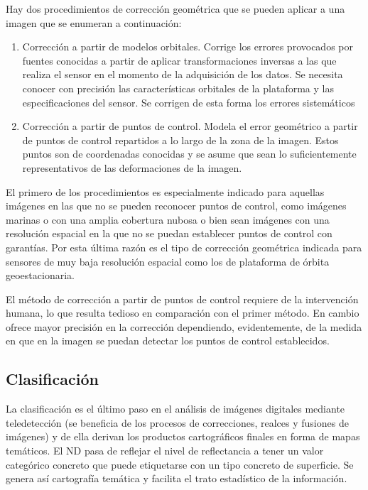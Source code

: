 Hay dos procedimientos de corrección geométrica que se pueden aplicar a una imagen que se enumeran a continuación:

\begin{enumerate}
	\item Corrección a partir de modelos orbitales. Corrige los errores provocados por fuentes conocidas a partir de aplicar transformaciones inversas a las que realiza el sensor en el momento de la adquisición de los datos. Se necesita conocer con precisión las características orbitales de la plataforma y las especificaciones del sensor. Se corrigen de esta forma los errores sistemáticos
	\item Corrección a partir de puntos de control. Modela el error geométrico a partir de puntos de control repartidos a lo largo de la zona de la imagen. Estos puntos son de coordenadas conocidas y se asume que sean lo suficientemente representativos de las deformaciones de la imagen.
\end{enumerate}

El primero de los procedimientos es especialmente indicado para aquellas imágenes en las que no se pueden reconocer puntos de control, como imágenes marinas o con una amplia cobertura nubosa o bien sean imágenes con una resolución espacial en la que no se puedan establecer puntos de control con garantías. Por esta última razón es el tipo de corrección geométrica indicada para sensores de muy baja resolución espacial como los de plataforma de órbita geoestacionaria.%

El método de corrección a partir de puntos de control requiere de la intervención humana, lo que resulta tedioso en comparación con el primer método. En cambio ofrece mayor precisión en la corrección dependiendo, evidentemente, de la medida en que en la imagen se puedan detectar los puntos de control establecidos.%

\subsection{Clasificación}
La clasificación es el último paso en el análisis de imágenes digitales mediante teledetección (se beneficia de los procesos de correcciones, realces y fusiones de imágenes) y de ella derivan los productos cartográficos finales en forma de mapas temáticos. El \ac{ND} pasa de reflejar el nivel de reflectancia a tener un valor categórico concreto que puede etiquetarse con un tipo concreto de superficie. Se genera así cartografía temática y facilita el trato estadístico de la información.%

